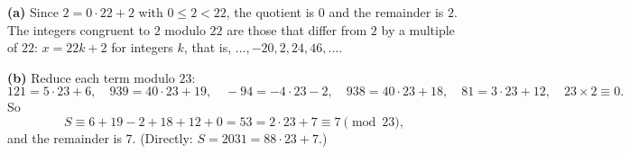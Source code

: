 \textbf{(a)} Since $2=0\cdot22+2$ with $0\le2<22$, the quotient is $0$ and the remainder is $\boxed{2}$. The integers congruent to $2$ modulo $22$ are those that differ from $2$ by a multiple of $22$: $x=22k+2$ for integers $k$, that is, $\dots,-20,2,24,46,\dots$.

\textbf{(b)} Reduce each term modulo $23$:
\[121=5\cdot23+6,\quad 939=40\cdot23+19,\quad -94=-4\cdot23-2,\quad 938=40\cdot23+18,\quad 81=3\cdot23+12,\quad 23\times2\equiv0 .\]
So
\[S\equiv6+19-2+18+12+0=53=2\cdot23+7\equiv7\pmod{23},\]
and the remainder is $\boxed{7}$. (Directly: $S=2031=88\cdot23+7$.)

